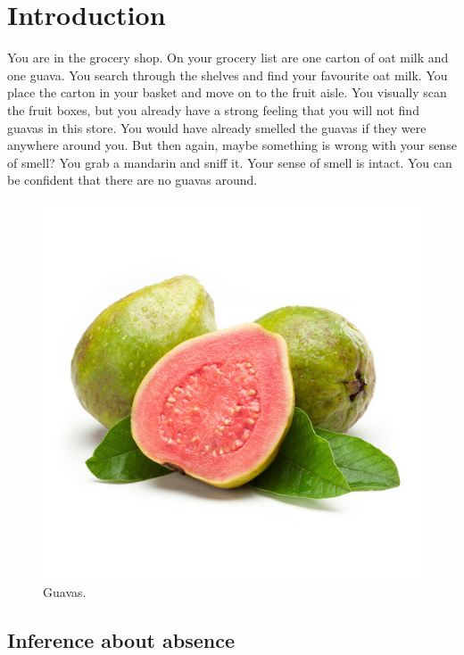 \documentclass[12pt,twoside]{reedthesis}
\begin{document}
\hypertarget{introduction}{%
\chapter*{Introduction}\label{introduction}}

You are in the grocery shop. On your grocery list are one carton of oat milk and one guava. You search through the shelves and find your favourite oat milk. You place the carton in your basket and move on to the fruit aisle. You visually scan the fruit boxes, but you already have a strong feeling that you will not find guavas in this store. You would have already smelled the guavas if they were anywhere around you. But then again, maybe something is wrong with your sense of smell? You grab a mandarin and sniff it. Your sense of smell is intact. You can be confident that there are no guavas around.
\begin{figure}[!h]
\includegraphics[width=\textwidth]{figure/intro/guava} \caption[Guavas]{Guavas.}\label{fig:intro-guava}
\end{figure}
\hypertarget{inference-about-absence}{%
\section{Inference about absence}\label{inference-about-absence}}
\end{document}
